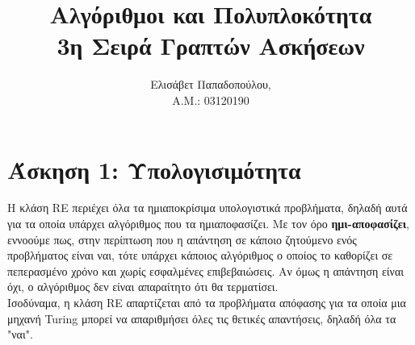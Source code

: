 \documentclass{article}
\begin{document}
\title{\section*{\centering Αλγόριθμοι και Πολυπλοκότητα\\[1ex] 3η Σειρά Γραπτών Ασκήσεων}}
\date{}
\author{Ελισάβετ Παπαδοπούλου, \\ Α.Μ.: 03120190}
\maketitle

\section*{\large Άσκηση 1: Υπολογισιμότητα}
Η κλάση RE περιέχει όλα τα ημιαποκρίσιμα υπολογιστικά προβλήματα, δηλαδή αυτά για τα οποία υπάρχει αλγόριθμος που τα ημιαποφασίζει. Με τον όρο \textbf{ημι-αποφασίζει}, εννοούμε πως, στην περίπτωση που η απάντηση σε κάποιο ζητούμενο ενός προβλήματος είναι ναι, τότε υπάρχει κάποιος αλγόριθμος ο οποίος το καθορίζει σε πεπερασμένο χρόνο και χωρίς εσφαλμένες επιβεβαιώσεις. Αν όμως η απάντηση είναι όχι, ο αλγόριθμος δεν είναι απαραίτητο ότι θα τερματίσει. \\
Ισοδύναμα, η κλάση RE απαρτίζεται από τα προβλήματα απόφασης για τα οποία μια μηχανή Turing μπορεί να απαριθμήσει όλες τις θετικές απαντήσεις, δηλαδή όλα τα "ναι". 
\end{document}
